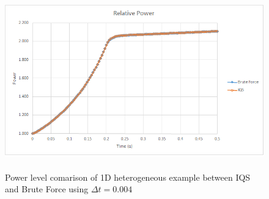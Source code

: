 \documentclass[12pt]{article}
\begin{document}
\begin{figure}[!htbp]
\centering
\includegraphics[height=3.0in]{figures/TWIGL_power_plot.png}
\caption{Power level comarison of 1D heterogeneous example between IQS and Brute Force using $\Delta t = 0.004$}
\label{fig:TWIGL_power}
\end{figure}
\end{document}
